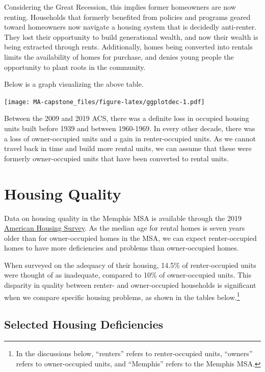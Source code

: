 \documentclass[
]{book}
\begin{document}
Considering the Great Recession, this implies former homeowners are now renting. Households that formerly benefited from policies and programs geared toward homeowners now navigate a housing system that is decidedly anti-renter. They lost their opportunity to build generational wealth, and now their wealth is being extracted through rents. Additionally, homes being converted into rentals limits the availability of homes for purchase, and denies young people the opportunity to plant roots in the community.

Below is a graph visualizing the above table.

\texttt{[image: MA-capstone\_files/figure-latex/ggplotdec-1.pdf]}

Between the 2009 and 2019 ACS, there was a definite loss in occupied housing units built before 1939 and between 1960-1969. In every other decade, there was a loss of owner-occupied units and a gain in renter-occupied units. As we cannot travel back in time and build more rental units, we can assume that these were formerly owner-occupied units that have been converted to rental units.

\hypertarget{housing-quality}{%
\section{Housing Quality}\label{housing-quality}}

Data on housing quality in the Memphis MSA is available through the 2019 \href{https://www.census.gov/programs-surveys/ahs.html}{American Housing Survey}. As the median age for rental homes is seven years older than for owner-occupied homes in the MSA, we can expect renter-occupied homes to have more deficiencies and problems than owner-occupied homes.

When surveyed on the adequacy of their housing, 14.5\% of renter-occupied units were thought of as inadequate, compared to 10\% of owner-occupied units. This disparity in quality between renter- and owner-occupied households is significant when we compare specific housing problems, as shown in the tables below.\footnote{In the discussions below, ``renters'' refers to renter-occupied units, ``owners'' refers to owner-occupied units, and ``Memphis'' refers to the Memphis MSA.}

\hypertarget{selected-housing-deficiencies}{%
\subsection{Selected Housing Deficiencies}\label{selected-housing-deficiencies}}
\end{document}
